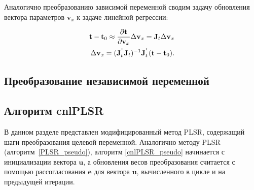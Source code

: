 \documentclass[12pt,twoside]{article}
\newcommand{\bY}{\mathbf{Y}}
\newcommand{\bX}{\mathbf{X}}
\newcommand{\bu}{\mathbf{u}}
\newcommand{\bt}{\mathbf{t}}
\newcommand{\bv}{\mathbf{v}}
\newcommand{\be}{\mathbf{e}}
\newcommand{\bJ}{\mathbf{J}}
\begin{document}
Аналогично преобразованию зависимой переменной сводим задачу обновления вектора параметров $\bv_x$ к задаче линейной регрессии:

\begin{align*}
    \bt - \bt_0 \approx \frac {\partial \bt}{\partial \bv_x} \Delta \bv_x = \bJ_t \Delta \bv_x \\
    \Delta \bv_x  = (\bJ_t^{\T} \bJ_t)^{-1} \bJ_t^{\T} (\bt - \bt_0).
\end{align*}

\subsection{Преобразование независимой переменной}



\subsection{Алгоритм cnlPLSR}
В данном разделе представлен модифицированный метод PLSR, содержащий шаги преобразования целевой переменной. Аналогично методу PLSR (алгоритм~\ref{PLSR_pseudo}), алгоритм \ref{cnlPLSR_pseudo} начинается с инициализации вектора $\bu$, а обновления весов преобразования считается с помощью рассогласования $\be$ для вектора $\bu$, вычисленного в цикле и на предыдущей итерации.
\vspace{-0.5cm}
\end{document}
